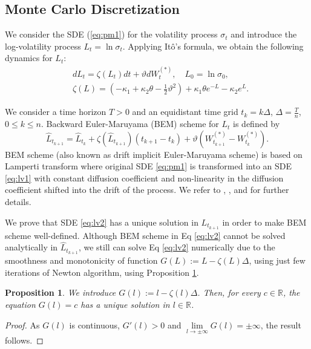 \documentclass[pdftex,11pt,a4paper] {article}
\newtheorem{proposition}{Proposition}[section]
\begin{document}
\subsection{Monte Carlo Discretization}\label{sec:discretiz_and_conv}

We consider the SDE (\ref{eq:pm1}) for the volatility process $\sigma_t$ and introduce the log-volatility process $L_{t}=\ln \sigma_{t}$. Applying It\^{o}'s formula, we obtain the following dynamics for $L_{t}$:
\begin{equation} \label{eq:lv1}
\begin{split}
& dL_{t} =\zeta(L_{t})dt + \vartheta dW^{(*)}_{t}, \quad L_{0}=\ln \sigma_{0},\\
& \zeta(L)=\left(-\kappa_{1}+ \kappa_{2}\theta-\frac{1}{2}\vartheta^{2}\right) + \kappa_{1}\theta e^{-L}  - \kappa_{2}e^{L}.
\end{split}
\end{equation}

We consider a time horizon $T>0$ and an equidistant time grid $t_k=k\Delta$, $\Delta=\frac{T}{n}$, $0\le k\le n$. Backward Euler-Maruyama (BEM) scheme for $L_t$ is defined by
\begin{equation} \label{eq:lv2}
\hat L_{t_{k+1}}=\hat L_{t_k}+\zeta\left(\hat L_{t_{k+1}}\right)(t_{k+1}-t_k)+\vartheta\left(W^{(*)}_{t_{k+1}}-W^{(*)}_{t_k}\right).
\end{equation}
BEM scheme (also known as drift implicit Euler-Maruyama scheme) is based on Lamperti transform where original SDE \eqref{eq:pm1} is transformed into an SDE \eqref{eq:lv1} with constant diffusion coefficient and non-linearity in the diffusion coefficient shifted into the drift of the process. We refer to \cite{NeuenSzp2014}, \cite{Alfonsi2}, and \cite{Chassagneux} for further details.


We prove that SDE \eqref{eq:lv2} has a unique solution in $L_{t_{k+1}}$ in order to make BEM scheme well-defined. Although BEM scheme in Eq \eqref{eq:lv2} cannot be solved analytically in $\hat L_{t_{k+1}}$, we still can solve Eq \eqref{eq:lv2} numerically due to the smoothness and monotonicity of function $G(L):=L-\zeta(L)\Delta$, using just few iterations of Newton algorithm, using Proposition \ref{prop:smooth_G}.

\begin{proposition}\label{prop:smooth_G}
We introduce $G(l):=l-\zeta(l)\Delta$. Then, for every $c\in \mathbb{R}$, the equation $G(l)=c$ has a unique solution in $l\in \mathbb{R}$.
\end{proposition}
\begin{proof}
As $G(l)$ is continuous, $G'(l)>0$ and $\lim\limits_{l\to \pm\infty}G(l)=\pm\infty$, the result  follows.
\end{proof}
\end{document}
